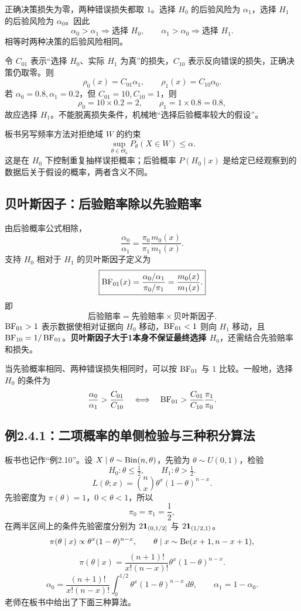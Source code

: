 正确决策损失为零，两种错误损失都取 $1$。选择 $H_0$ 的后验风险为 $\alpha_1$，选择 $H_1$ 的后验风险为 $\alpha_0$。因此
\[
\alpha_0>\alpha_1\Rightarrow\text{选择 }H_0,\qquad
\alpha_1>\alpha_0\Rightarrow\text{选择 }H_1.
\]
相等时两种决策的后验风险相同。

令 $C_{01}$ 表示“选择 $H_0$、实际 $H_1$ 为真”的损失，$C_{10}$ 表示反向错误的损失，正确决策仍取零。则
\[
\rho_0(x)=C_{01}\alpha_1,\qquad\rho_1(x)=C_{10}\alpha_0.
\]
若 $\alpha_0=0.8,\alpha_1=0.2$，但 $C_{01}=10,C_{10}=1$，则
\[
\rho_0=10\times0.2=2,\qquad\rho_1=1\times0.8=0.8,
\]
故应选择 $H_1$。不能脱离损失条件，机械地“选择后验概率较大的假设”。

板书另写频率方法对拒绝域 $W$ 的约束
\[
\sup_{\theta\in\Theta_0}P_\theta(X\in W)\leq\alpha.
\]
这是在 $H_0$ 下控制重复抽样误拒概率；后验概率 $P(H_0\mid x)$ 是给定已经观察到的数据后关于假设的概率，两者含义不同。

\subsection{贝叶斯因子：后验赔率除以先验赔率}
由后验概率公式相除，
\[
\frac{\alpha_0}{\alpha_1}
=\frac{\pi_0}{\pi_1}\frac{m_0(x)}{m_1(x)}.
\]
支持 $H_0$ 相对于 $H_1$ 的贝叶斯因子定义为
\[
\boxed{\operatorname{BF}_{01}(x)=\frac{\alpha_0/\alpha_1}{\pi_0/\pi_1}
=\frac{m_0(x)}{m_1(x)}.}
\]
即
\[
\boxed{\text{后验赔率}=\text{先验赔率}\times\text{贝叶斯因子}.}
\]
$\operatorname{BF}_{01}>1$ 表示数据使相对证据向 $H_0$ 移动，$\operatorname{BF}_{01}<1$ 则向 $H_1$ 移动，且 $\operatorname{BF}_{10}=1/\operatorname{BF}_{01}$。\textbf{贝叶斯因子大于1本身不保证最终选择 $H_0$}，还需结合先验赔率和损失。

当先验概率相同、两种错误损失相同时，可以按 $\operatorname{BF}_{01}$ 与 $1$ 比较。一般地，选择 $H_0$ 的条件为
\[
\frac{\alpha_0}{\alpha_1}>\frac{C_{01}}{C_{10}}
\quad\Longleftrightarrow\quad
\operatorname{BF}_{01}>\frac{C_{01}}{C_{10}}\frac{\pi_1}{\pi_0}.
\]

\subsection{例2.4.1：二项概率的单侧检验与三种积分算法}
板书也记作“例2.10”。设 $X\mid\theta\sim\operatorname{Bin}(n,\theta)$，先验为 $\theta\sim U(0,1)$，检验
\[
H_0:\theta\leq\tfrac12,\qquad H_1:\theta>\tfrac12.
\]
\[
L(\theta;x)=\binom nx\theta^x(1-\theta)^{n-x}.
\]
先验密度为 $\pi(\theta)=1$，$0<\theta<1$，所以
\[
\pi_0=\pi_1=\frac12,
\]
在两半区间上的条件先验密度分别为 $2\mathbf{1}_{(0,1/2]}$ 与 $2\mathbf{1}_{(1/2,1)}$。
\[
\pi(\theta\mid x)\propto\theta^x(1-\theta)^{n-x},\qquad
\theta\mid x\sim\operatorname{Be}(x+1,n-x+1),
\]
\[
\pi(\theta\mid x)=\frac{(n+1)!}{x!(n-x)!}\theta^x(1-\theta)^{n-x}.
\]
\[
\alpha_0=\frac{(n+1)!}{x!(n-x)!}
\int_0^{1/2}\theta^x(1-\theta)^{n-x}\,d\theta,
\qquad\alpha_1=1-\alpha_0.
\]
老师在板书中给出了下面三种算法。

